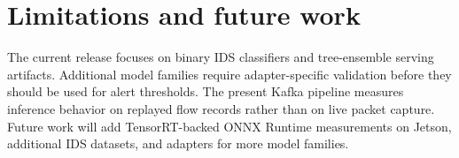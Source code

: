 \section{Limitations and future work}
\label{sec:limits}

The current release focuses on binary IDS classifiers and tree-ensemble serving artifacts. Additional model families require adapter-specific validation before they should be used for alert thresholds. The present Kafka pipeline measures inference behavior on replayed flow records rather than on live packet capture. Future work will add TensorRT-backed ONNX Runtime measurements on Jetson, additional IDS datasets, and adapters for more model families.
